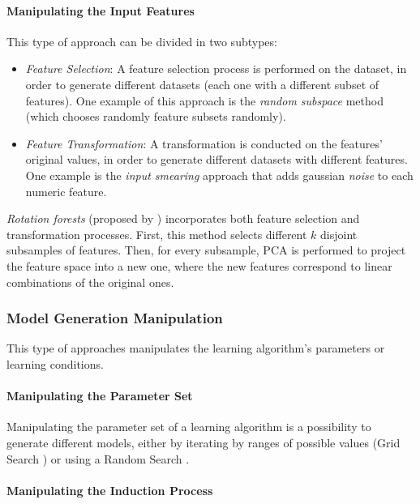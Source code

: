\paragraph{Manipulating the Input Features}\mbox{}

This type of approach can be divided in two subtypes:

\begin{itemize}
	\item \textit{Feature Selection}: 
	A feature selection process is performed on the dataset, in order to generate different datasets (each one with a different subset of features).
	One example of this approach is the \textit{random subspace} method \cite{ho1998random} (which chooses randomly feature subsets randomly).
	
	\item \textit{Feature Transformation}:
	A transformation is conducted on the features' original values, in order to generate different datasets with different features.
	One example is the \textit{input smearing} approach \cite{Frank2006} that adds gaussian \textit{noise} to each numeric feature.
\end{itemize}

\textit{Rotation forests} (proposed by \textcite{1677518}) incorporates both feature selection and transformation processes. First, this method selects different $k$ disjoint subsamples of features. Then, for every subsample, PCA is performed to project the feature space into a new one, where the new features correspond to linear combinations of the original ones.

\subsubsection{Model Generation Manipulation}

This type of approaches manipulates the learning algorithm's parameters or learning conditions.

\paragraph{Manipulating the Parameter Set}\mbox{}

Manipulating the parameter set of a learning algorithm is a possibility to generate different models, either by iterating by ranges of possible values (Grid Search \cite{hsu2003practical}) or using a Random Search \cite{bergstra2012random}.

\paragraph{Manipulating the Induction Process}\mbox{}

